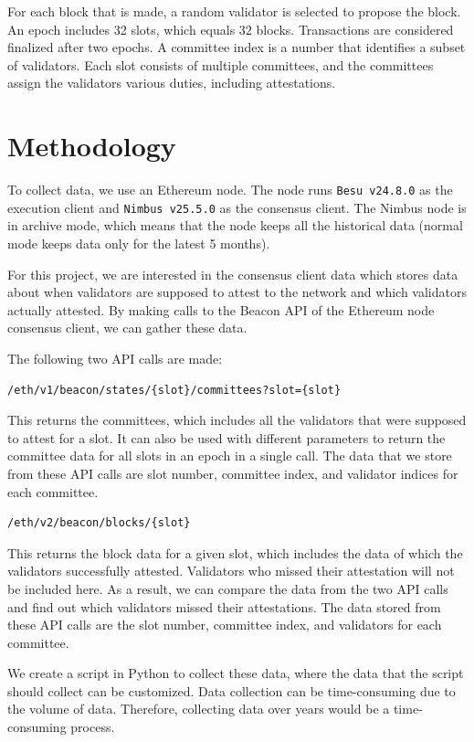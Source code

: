 \documentclass[runningheads]{llncs}
\begin{document}
For each block that is made, a random validator is selected to propose the block. An epoch includes 32 slots, which equals $32$ blocks. Transactions are considered finalized after two epochs. A committee index is a number that identifies a subset of validators. Each slot consists of multiple committees, and the committees assign the validators various duties, including attestations. 

\section{Methodology}

To collect data, we use an Ethereum node. The node runs {\tt Besu~v24.8.0} as the execution client and {\tt Nimbus~v25.5.0} as the consensus client. 
The Nimbus node is in archive mode, which means that the node keeps all the historical data (normal mode keeps data only for the latest 5 months).

For this project, we are interested in the consensus client data which stores data about when validators are supposed to attest to the network and which validators actually attested. By making calls to the Beacon API of the Ethereum node consensus client, we can gather these data.

The following two API calls are made:
\begin{verbatim}/eth/v1/beacon/states/{slot}/committees?slot={slot}\end{verbatim}
This returns the committees, which includes all the validators that were supposed to attest for a slot. It can also be used with different parameters to return the committee data for all slots in an epoch in a single call. The data that we store from these API calls are slot number, committee index, and validator indices for each committee. 

\begin{verbatim}/eth/v2/beacon/blocks/{slot}\end{verbatim}
This returns the block data for a given slot, which includes the data of which the validators successfully attested.
Validators who missed their attestation will not be included here. As a result, we can compare the data from the two API calls and find out which validators missed their attestations. The data stored from these API calls are the slot number, committee index, and validators for each committee. 

We create a script in Python to collect these data, where the data that the script should collect can be customized. Data collection can be time-consuming due to the volume of data.
Therefore, collecting data over years would be a time-consuming process. 
\end{document}
